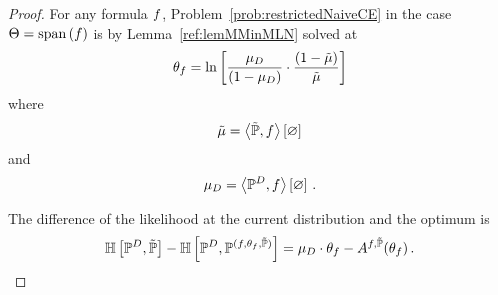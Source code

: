 \begin{proof}
	For any formula $f$, Problem~\ref{prob:restrictedNaiveCE}  in the case $\Theta = \mathrm{span}\left(f\right) $ is by Lemma~\ref{ref:lemMMinMLN} solved at
		\[ \theta_{f} = \ln \left[ \frac{\mu_{D}}{(1-\mu_{D})}\cdot \frac{(1-\tilde{\mu})}{\tilde{\mu}} \right]  \]
	where
		\[ \tilde{\mu} = \left\langle \tilde{\mathbb{P}},f\right\rangle \left[ \varnothing \right] \]
	and
		\[ \mu_{D} = \left\langle \mathbb{P}^{D},f\right\rangle \left[ \varnothing \right] \, . \]
	
	The difference of the likelihood at the current distribution and the optimum is
	\begin{align*}
		\mathbb{H}\left[\mathbb{P}^{D},\tilde{\mathbb{P}}\right]
		- \mathbb{H}\left[\mathbb{P}^{D},\mathbb{P}^{(f,\theta_{f},\tilde{\mathbb{P}})}\right]
		= \mu_{D} \cdot \theta_{f} - A^{f,\tilde{\mathbb{P}}}(\theta_{f}) \, .
	\end{align*}
	

\end{proof}

